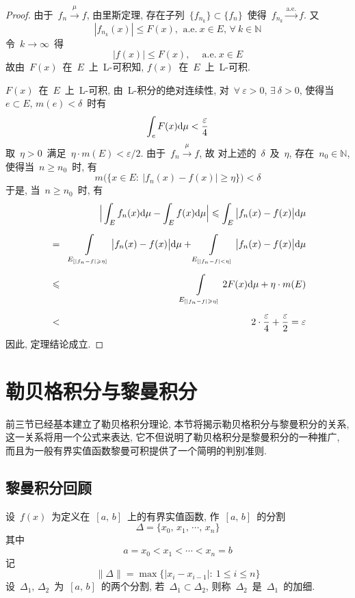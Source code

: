 \begin{proof}
由于~$f_n \xrightarrow{~\mu~} f$, 由里斯定理, 存在子列~$\{f_{n_k}\} \subset \{f_n\}$~使得~$f_{n_k} \xrightarrow{\mathrm{a.e.}} f$. 又
\[
|f_{n_k}(x)| \leqslant F(x),  \,  \mathrm{~a.e.~} x \in E, \,  \forall~k \in \mathbb{N}
\]
令~$k \to \infty$~得
\[
|f(x)| \leqslant F(x),  \quad \mathrm{~a.e.~} x \in E
\]
故由~$F(x)$~在~$E$~上~L-可积知, $f(x)$~在~$E$~上~L-可积.

$F(x)$~在~$E$~上~L-可积, 由~L-积分的绝对连续性, 对~$\forall~\varepsilon > 0$, $\exists~ \delta > 0$,  使得当~$e \subset E, \, m(e) < \delta$~时有
\[
\int_e F(x) \mathrm{d} \mu < \frac{\varepsilon}{4}
\]
取~$\eta > 0$~满足~$\eta \cdot m(E) < \varepsilon/2$. 由于~$f_n \xrightarrow{~\mu~} f$, 故
对上述的~$\delta$~及~$\eta$, 存在~$n_0 \in \mathbb{N}$, 使得当~$n \geqslant n_0$~时, 有
\[
m \big( \{x \in E: \: |f_n(x) - f(x)| \geqslant \eta\} \big) < \delta
\]
于是, 当~$n \geqslant n_0$~时, 有
\begin{eqnarray*}
&&\Big| \int_E f_n(x) \mathrm{d} \mu - \int_E f(x) \mathrm{d} \mu \Big| \leqslant \int_E \big| f_n(x) - f(x) \big| \mathrm{d} \mu \\[0.2cm]
&=& \int\limits_{E_{[|f_n- f| \geqslant \eta]}} \big| f_n(x) - f(x) \big| \mathrm{d} \mu + \int\limits_{E_{[|f_n - f| < \eta]}} \big| f_n(x) - f(x) \big| \mathrm{d} \mu \\[0.2cm]
&\leqslant& \int\limits_{E_{[|f_n- f| \geqslant \eta]}} 2 F(x) \mathrm{d} \mu + \eta \cdot m(E) \\[0.2cm]
&<& 2 \cdot \frac{\varepsilon}{4} + \frac{\varepsilon}{2} = \varepsilon
\end{eqnarray*}
因此, 定理结论成立.
\end{proof}

\section{勒贝格积分与黎曼积分}

前三节已经基本建立了勒贝格积分理论, 本节将揭示勒贝格积分与黎曼积分的关系, 这一关系将用一个公式来表达, 它不但说明了勒贝格积分是黎曼积分的一种推广, 而且为一般有界实值函数黎曼可积提供了一个简明的判别准则.


\subsection{黎曼积分回顾}

设~$f(x)$~为定义在~$[a,\, b]$~上的有界实值函数, 作~$[a,\, b]$~的分割
\[
\Delta = \{x_0,\, x_1,\, \cdots, \, x_n\}
\]
其中
\[
a = x_0 < x_1 < \cdots < x_n = b
\]
记
\[
\|\Delta\| = \max \{ |x_i - x_{i-1}|: \: 1 \leqslant i \leqslant n\}
\]
设~$\Delta_1,\, \Delta_2$~为~$[a,\, b]$~的两个分割, 若~$\Delta_1 \subset \Delta_2$, 则称~$\Delta_2$~是~$\Delta_1$~的加细.

